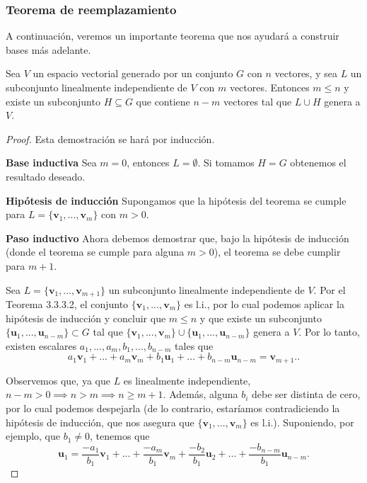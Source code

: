 \documentclass[12pt,dvipsnames]{article}
\newenvironment{teorema}[2][Teorema]{\begin{trivlist}
\item[\hskip \labelsep {\bfseries #1}\hskip \labelsep {\bfseries #2.}]}{\end{trivlist}}
\begin{document}
\subsubsection{Teorema de reemplazamiento} \label{Subsubsec:Teo_de_reemplazamiento}

A continuación, veremos un importante teorema que nos ayudará a construir bases más adelante.

\begin{teorema} {4.1.1}
    Sea $V$ un espacio vectorial generado por un conjunto $G$ con $n$ vectores, y sea $L$ un subconjunto linealmente independiente de $V$ con $m$ vectores. Entonces $m\le n$ y existe un subconjunto $H\subseteq G$ que contiene $n-m$ vectores tal que $L\cup H$ genera a $V$.

    \begin{proof}
        Esta demostración se hará por inducción.

    \vspace{3mm} 
    \textbf{Base inductiva}
    Sea $m=0$, entonces $L=\emptyset$. Si tomamos $H=G$ obtenemos el resultado deseado.

    \vspace{3mm} 
    \textbf{Hipótesis de inducción}
    Supongamos que la hipótesis del teorema se cumple para $L=\{\mathbf{v}_1,...,\mathbf{v}_m\}$ con $m>0$.

    \vspace{3mm} 
    \textbf{Paso inductivo}
    Ahora debemos demostrar que, bajo la hipótesis de inducción (donde el teorema se cumple para alguna $m>0$), el teorema se debe cumplir para $m+1$.\vspace{3mm}
    
     Sea $L=\{\mathbf{v}_1,...,\mathbf{v}_{m+1}\}$ un subconjunto linealmente independiente de $V$. Por el Teorema 3.3.3.2, el conjunto $\{\mathbf{v}_1,...,\mathbf{v}_m\}$ es l.i., por lo cual podemos aplicar la hipótesis de inducción y concluir que $m\le n$ y que existe un subconjunto $\{\mathbf{u}_1,...,\mathbf{u}_{n-m}\}\subset G$ tal que $\{\mathbf{v}_1,...,\mathbf{v}_m\}\cup\{\mathbf{u}_1,...,\mathbf{u}_{n-m}\}$ genera a $V$. Por lo tanto, existen escalares $a_1,...,a_m,b_1,...,b_{n-m}$ tales que \[
        a_1\mathbf{v}_1+...+a_m\mathbf{v}_m+b_1\mathbf{u}_1+...+b_{n-m}\mathbf{u}_{n-m}=\mathbf{v}_{m+1}.
    .\] 

    Observemos que, ya que $L$ es linealmente independiente, $n-m>0\implies n>m\implies n\ge m+1$. Además, alguna $b_i$ debe ser distinta de cero, por lo cual podemos despejarla (de lo contrario, estaríamos contradiciendo la hipótesis de inducción, que nos asegura que $\{\mathbf{v}_1,...,\mathbf{v}_m\}$ es l.i.). Suponiendo, por ejemplo, que $b_1\neq 0$, tenemos que \[
        \mathbf{u}_1=\frac{-a_1}{b_1}\mathbf{v}_1+...+\frac{-a_m}{b_1}\mathbf{v}_m+\frac{-b_2}{b_1}\mathbf{u}_2+...+\frac{-b_{n-m}}{b_1}\mathbf{u}_{n-m}
    .\] 


\end{proof}
\end{teorema}
\end{document}

